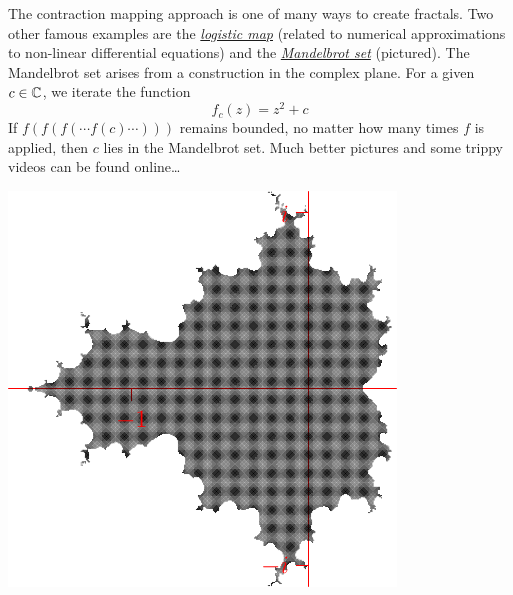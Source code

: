 \begin{minipage}[t]{0.58\linewidth}\vspace{0pt}
	
	The contraction mapping approach is one of many ways to create fractals. Two other famous examples are the \href{https://en.wikipedia.org/wiki/Logistic_map}{\emph{logistic map}} (related to numerical approximations to non-linear differential equations) and the \href{https://en.wikipedia.org/wiki/Mandelbrot_set}{\emph{Mandelbrot set}} (pictured).\smallbreak
	The Mandelbrot set arises from a construction in the complex plane. For a given $c\in\mathbb{C}$, we iterate the function
	\[
		f_c(z)=z^2+c
	\]
	If $f(f(f(\cdots f(c)\cdots)))$ remains bounded, no matter how many times $f$ is applied, then $c$ lies in the Mandelbrot set.\smallbreak
	Much better pictures and some trippy videos can be found online\ldots
\end{minipage}
\hfill
\begin{minipage}[t]{0.4\linewidth}\vspace{0pt}
	\flushright\includegraphics{mandelbrot}
\end{minipage}
\goodbreak



